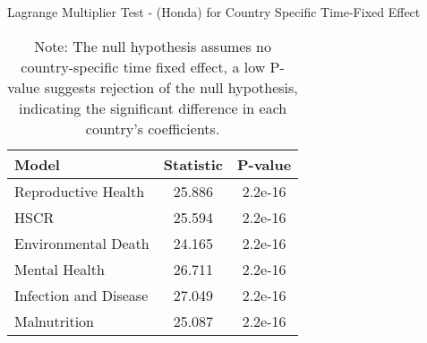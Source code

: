 \begin{table}[H]
    \centering
    \caption{Lagrange Multiplier Test - (Honda) for Country Specific Time-Fixed Effect}
    \begin{tabular}{lcc}
        \toprule
        \textbf{Model} & \textbf{Statistic} & \textbf{P-value} \\
        \midrule
        Reproductive Health & 25.886 & 2.2e-16 \\
        HSCR  & 25.594 & 2.2e-16 \\
        Environmental Death & 24.165 & 2.2e-16 \\
        Mental Health & 26.711 & 2.2e-16 \\
        Infection and Disease & 27.049 & 2.2e-16 \\
        Malnutrition & 25.087 & 2.2e-16 \\
        \bottomrule
    \end{tabular}
    \vspace{0.5em} %
    \caption*{Note: The null hypothesis assumes no country-specific time fixed effect, a low P-value suggests rejection of the null hypothesis, indicating the significant difference in each country's coefficients.}
    \label{Tab::UnitFE_Test}
\end{table}


